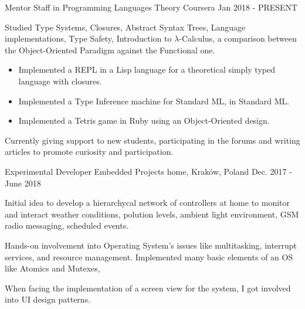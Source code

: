 
\begin{cventries}

\cventry
    {Mentor Staff in \href{https://www.coursera.org/learn/programming-languages}{}}
    {Programming Languages Theory}
    {Coursera}
    {Jan 2018 - PRESENT}
    {
        \begin{cvitems} %
            \item {Studied Type Systems, Closures, Abstract Syntax Trees, Language implementations, Type Safety, Introduction to $\lambda$-Calculus, a comparison between the Object-Oriented Paradigm against the Functional one.}
            \begin{itemize}
                \item {Implemented a REPL in a Lisp language for a theoretical simply typed language with closures.}
                \item {Implemented a Type Inference machine for Standard ML, in Standard ML.}
                \item {Implemented a Tetris game in Ruby using an Object-Oriented design.}
            \end{itemize}
            \item {Currently giving support to new students, participating in the forums and writing articles to promote curiosity and participation.}
        \end{cvitems}
    }

\cventry
    {Experimental Developer}
    {Embedded Projects}
    {home, Kraków, Poland}
    {Dec. 2017 - June 2018}
    {
        \begin{cvitems} %
            \item {Initial idea to develop a hierarchycal network of controllers at home to monitor and interact weather conditions, polution levels, ambient light environment, GSM radio messaging, scheduled events.}
            \item {Hands-on involvement into Operating System's issues like multitasking, interrupt services, and resource management. Implemented many basic elements of an OS like Atomics and Mutexes, }
            \item {When facing the implementation of a screen view for the system, I got involved into UI design patterns.}
        \end{cvitems}
    }


\end{cventries}
